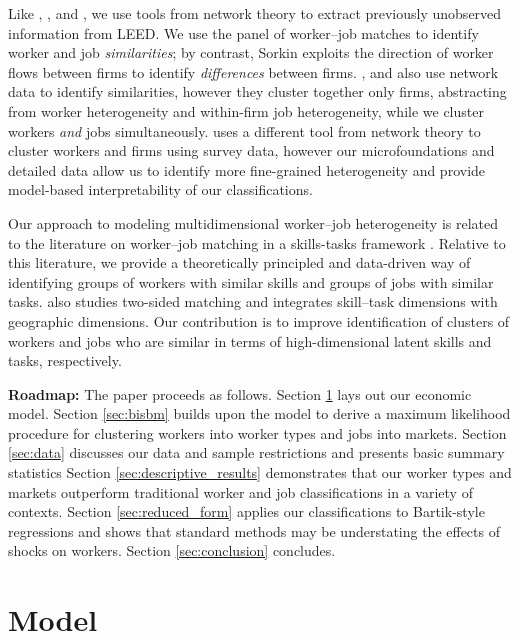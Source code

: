 \documentclass[12pt]{article}
\theoremstyle{definition}
\theoremstyle{plain}
\begin{document}
Like \citet{Sorkin2018}, \citet{Nimczik2018}, and \citet{JaroschNimczikSorkin2019}, we use tools from network theory to extract previously unobserved information from LEED. We use the panel of worker--job matches to identify worker and job \emph{similarities}; by contrast, Sorkin exploits the direction of worker flows between firms to identify \emph{differences} between firms. \citet{Nimczik2018}, and \citet{JaroschNimczikSorkin2019} also use network data to identify similarities, however they cluster together only firms, abstracting from worker heterogeneity and within-firm job heterogeneity, while we cluster workers \emph{and} jobs simultaneously. \citet{Schmutte2014} uses a different tool from network theory to cluster workers and firms using survey data, however our microfoundations and detailed data allow us to identify more fine-grained heterogeneity and provide model-based interpretability of our classifications. 

Our approach to modeling multidimensional worker--job heterogeneity is related to the literature on worker--job matching in a skills-tasks framework \citep{AutorLevyMurnane2003,AcemogluAutor2011,Autor2013,Lindenlaub2017,Tan2018,Kantenga2018}. Relative to this literature, we provide a theoretically principled and data-driven way of identifying groups of workers with similar skills and groups of jobs with similar tasks. \citet{Mansfield2019} also studies two-sided matching and integrates skill--task dimensions with geographic dimensions.  Our contribution is to improve identification of clusters of workers and jobs who are similar in terms of high-dimensional latent skills and tasks, respectively.

\textbf{Roadmap:} The paper proceeds as follows.  Section \ref{sec:model} lays out our economic model. Section \ref{sec:bisbm} builds upon the model to derive a maximum likelihood procedure for clustering workers into worker types and jobs into markets.  Section \ref{sec:data} discusses our data and sample restrictions and presents basic summary statistics Section \ref{sec:descriptive_results} demonstrates that our worker types and markets outperform traditional worker and job classifications in a variety of contexts. Section \ref{sec:reduced_form} applies our classifications to Bartik-style regressions and shows that standard methods may be understating the effects of shocks on workers. Section \ref{sec:conclusion} concludes.




\section{Model}
\label{sec:model}
\end{document}
